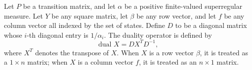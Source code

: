 Let $P$ be a transition matrix, and let $\alpha$ be a positive finite-valued superregular measure. Let $Y$ be any square matrix, let $\beta$ be any row vector, and let $f$ be any column vector all indexed by the set of states. Define $D$ to be a diagonal matrix whose $i$-th diagonal entry is $1/\alpha_i$. The duality operator is defined by
$$\text{dual } X = D X^T D^{-1},$$
where $X^T$ denotes the transpose of $X$. When $X$ is a row vector $\beta$, it is treated as a $1 \times n$ matrix; when $X$ is a column vector $f$, it is treated as an $n \times 1$ matrix.
